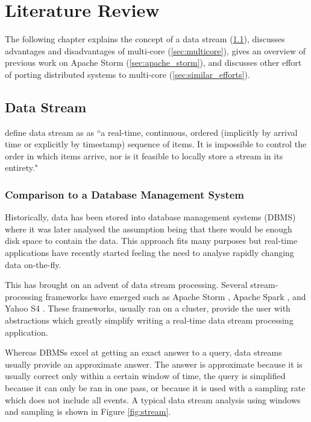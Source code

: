 \documentclass[bsc,logo,frontabs,twoside,singlespacing,normalheadings,parskip]{infthesis}\usepackage[]{graphicx}\usepackage[]{color}
\begin{document}
\clearpage{}\chapter{Literature Review}

The following chapter explains the concept of a data stream (\ref{sec:data_stream}), discusses advantages and disadvantages of multi-core (\ref{sec:multicore}), gives an overview of previous work on Apache Storm (\ref{sec:apache_storm}), and discusses other effort of porting distributed systems to multi-core (\ref{sec:similar_efforts}).

\section{Data Stream}
\label{sec:data_stream}

\textcite{golab2003issues} define data stream as as ``a real-time, continuous, ordered (implicitly by arrival time or explicitly by timestamp) sequence of items. It is impossible to control the order in which items arrive, nor is it feasible to locally store a stream in its entirety."

\subsection{Comparison to a Database Management System}

Historically, data has been stored into database management systems (DBMS) where it was later analysed the assumption being that there would be enough disk space to contain the data. This approach fits many purposes but real-time applications have recently started feeling the need to analyse rapidly changing data on-the-fly.

This has brought on an advent of data stream processing. Several stream-processing frameworks have emerged such as Apache Storm \citep{ApacheStorm}, Apache Spark \citep{ApacheSpark}, and Yahoo S4 \citep{YahooS4}. These frameworks, usually ran on a cluster, provide the user with abstractions which greatly simplify writing a real-time data stream processing application.

Whereas DBMSs excel at getting an exact answer to a query, data streams usually provide an approximate answer. The answer is approximate because it is usually correct only within a certain window of time, the query is simplified because it can only be ran in one pass, or because it is used with a sampling rate which does not include all events. A typical data stream analysis using windows and sampling is shown in Figure \ref{fig:stream}.
\end{document}

